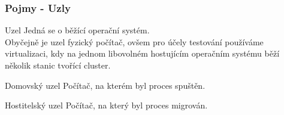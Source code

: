 \documentclass{beamer}
\begin{document}
\begin {frame}
\frametitle {Pojmy - Uzly}
	\begin {block} {Uzel}
		Jedná se o běžící operační systém.\\
		Obyčejně je uzel fyzický počítač, ovšem pro účely testování používáme virtualizaci, kdy na jednom libovolném hostujícím operačním systému běží několik stanic tvořící cluster. \cite{dpAndrejs}
	\end {block}
	\begin {block} {Domovský uzel}
		Počítač, na kterém byl proces spuštěn.
	\end {block}
	\begin {block} {Hostitelský uzel}
		Počítač, na který byl proces migrován.
	\end {block}
\end {frame}

\end{document}
